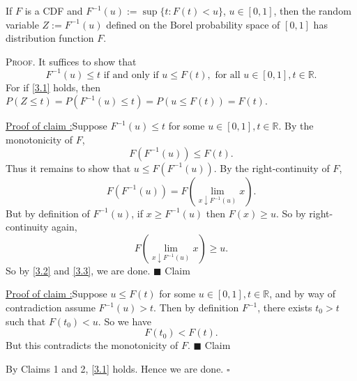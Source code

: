 \documentclass[12pt]{article}
\newcounter{ProofCounter}
\newcounter{ClaimCounter}[ProofCounter]
\newenvironment{Proof}{\stepcounter{ProofCounter}\textsc{Proof.}}{\hfill$\square$}
\newenvironment{claim}[1]{\vspace{1mm}\stepcounter{ClaimCounter}\par\noindent\underline{\bf Claim \theClaimCounter:}\space#1}{}
\newenvironment{claimproof}[1]{\par\noindent\underline{Proof of claim \theClaimCounter:}\space#1}{\hfill $\blacksquare$ Claim \theClaimCounter \\}
\begin{document}
\begin{Lemma}
  If $F$ is a CDF and $F^{-1}(u) := \sup \{ t : F(t) < u \}$, $u \in [0, 1]$, then the random variable $Z := F^{-1}(u)$ defined on the Borel probability space of $[0, 1]$ has distribution function $F$.
\end{Lemma}
\begin{Proof}
  It suffices to show that
  \begin{equation}
    F^{-1}(u) \leq t \text{ if and only if } u \leq F(t), \text{ for all  } u \in [0,1], t \in \mathbb{R}.
    \label{3.1}
  \end{equation}
  For if \eqref{3.1} holds, then $P(Z \leq t) = P(F^{-1}(u) \leq t) = P(u \leq F(t)) = F(t)$.

  \begin{claimproof}
    Suppose $F^{-1}(u) \leq t$ for some $u \in [0, 1], t \in \mathbb{R}$. By the monotonicity of $F$,
    \[
      F(F^{-1}(u)) \leq F(t).
    \]
    Thus it remains to show that $u \leq F(F^{-1}(u))$. By the right-continuity of $F$,
    \begin{equation}
      F(F^{-1}(u)) = F\left(\lim_{x\downarrow F^{-1}(u)}x\right).
      \label{3.2}
    \end{equation}
    But by definition of $F^{-1}(u)$, if $x \geq F^{-1}(u)$ then $F(x) \geq u$. So by right-continuity again,
    \begin{equation}
      F\left(\lim_{x\downarrow F^{-1}(u)}x\right) \geq u.
      \label{3.3}
    \end{equation}
    So by \eqref{3.2} and \eqref{3.3}, we are done.
  \end{claimproof}

  \begin{claimproof}
    Suppose $u \leq F(t)$ for some $u \in [0, 1], t \in \mathbb{R}$, and by way of contradiction assume $F^{-1}(u) > t$. Then by definition $F^{-1}$, there exists $t_0 > t$ such that $F(t_0) < u$. So we have
    \[
      F(t_0) < F(t).
    \]
    But this contradicts the monotonicity of $F$.
  \end{claimproof}

  By Claims 1 and 2, \eqref{3.1} holds. Hence we are done.
\end{Proof}
\end{document}

